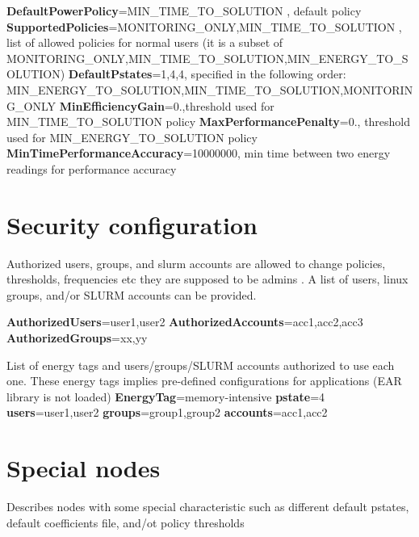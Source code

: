 {\bfseries Default\+Power\+Policy}=M\+I\+N\+\_\+\+T\+I\+M\+E\+\_\+\+T\+O\+\_\+\+S\+O\+L\+U\+T\+I\+ON , default policy {\bfseries Supported\+Policies}=M\+O\+N\+I\+T\+O\+R\+I\+N\+G\+\_\+\+O\+N\+LY,M\+I\+N\+\_\+\+T\+I\+M\+E\+\_\+\+T\+O\+\_\+\+S\+O\+L\+U\+T\+I\+ON , list of allowed policies for normal users (it is a subset of M\+O\+N\+I\+T\+O\+R\+I\+N\+G\+\_\+\+O\+N\+LY,M\+I\+N\+\_\+\+T\+I\+M\+E\+\_\+\+T\+O\+\_\+\+S\+O\+L\+U\+T\+I\+ON,M\+I\+N\+\_\+\+E\+N\+E\+R\+G\+Y\+\_\+\+T\+O\+\_\+\+S\+O\+L\+U\+T\+I\+ON) {\bfseries Default\+Pstates}=1,4,4, specified in the following order\+: M\+I\+N\+\_\+\+E\+N\+E\+R\+G\+Y\+\_\+\+T\+O\+\_\+\+S\+O\+L\+U\+T\+I\+ON,M\+I\+N\+\_\+\+T\+I\+M\+E\+\_\+\+T\+O\+\_\+\+S\+O\+L\+U\+T\+I\+ON,M\+O\+N\+I\+T\+O\+R\+I\+N\+G\+\_\+\+O\+N\+LY {\bfseries Min\+Efficiency\+Gain}=0.,threshold used for M\+I\+N\+\_\+\+T\+I\+M\+E\+\_\+\+T\+O\+\_\+\+S\+O\+L\+U\+T\+I\+ON policy {\bfseries Max\+Performance\+Penalty}=0., threshold used for M\+I\+N\+\_\+\+E\+N\+E\+R\+G\+Y\+\_\+\+T\+O\+\_\+\+S\+O\+L\+U\+T\+I\+ON policy {\bfseries Min\+Time\+Performance\+Accuracy}=10000000, min time between two energy readings for performance accuracy

\section*{Security configuration}

Authorized users, groups, and slurm accounts are allowed to change policies, thresholds, frequencies etc they are supposed to be admins . A list of users, linux groups, and/or S\+L\+U\+RM accounts can be provided.

{\bfseries Authorized\+Users}=user1,user2 {\bfseries Authorized\+Accounts}=acc1,acc2,acc3 {\bfseries Authorized\+Groups}=xx,yy

List of energy tags and users/groups/\+S\+L\+U\+RM accounts authorized to use each one. These energy tags implies pre-\/defined configurations for applications (E\+AR library is not loaded) {\bfseries Energy\+Tag}=memory-\/intensive {\bfseries pstate}=4 {\bfseries users}=user1,user2 {\bfseries groups}=group1,group2 {\bfseries accounts}=acc1,acc2

\section*{Special nodes}

Describes nodes with some special characteristic such as different default pstates, default coefficients file, and/ot policy thresholds

